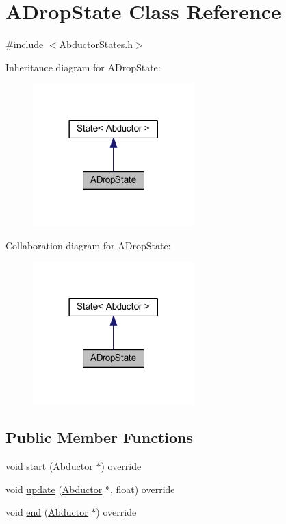 \hypertarget{class_a_drop_state}{}\section{A\+Drop\+State Class Reference}
\label{class_a_drop_state}


{\ttfamily \#include $<$Abductor\+States.\+h$>$}



Inheritance diagram for A\+Drop\+State\+:
\nopagebreak
\begin{figure}[H]
\begin{center}
\leavevmode
\includegraphics[width=177pt]{class_a_drop_state__inherit__graph}
\end{center}
\end{figure}


Collaboration diagram for A\+Drop\+State\+:
\nopagebreak
\begin{figure}[H]
\begin{center}
\leavevmode
\includegraphics[width=177pt]{class_a_drop_state__coll__graph}
\end{center}
\end{figure}
\subsection*{Public Member Functions}
\begin{DoxyCompactItemize}
\item 
void \hyperlink{class_a_drop_state_ab41abe3006ca9d4dec5e93a800a03e01}{start} (\hyperlink{class_abductor}{Abductor} $\ast$) override
\item 
void \hyperlink{class_a_drop_state_a50ee2cafa31714ee14223e6cce007f08}{update} (\hyperlink{class_abductor}{Abductor} $\ast$, float) override
\item 
void \hyperlink{class_a_drop_state_a6af566dd1e06d425f16a69bbd11e811f}{end} (\hyperlink{class_abductor}{Abductor} $\ast$) override
\end{DoxyCompactItemize}
